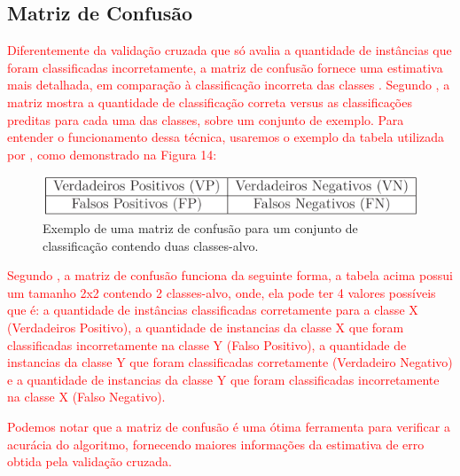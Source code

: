 \subsection{Matriz de Confusão}

\par
\textcolor{red}{Diferentemente da validação cruzada que só avalia a quantidade de instâncias que foram classificadas incorretamente, a matriz de confusão fornece uma estimativa mais detalhada, em comparação à classificação incorreta das classes \cite{Carvalho2014}. Segundo , a matriz mostra a quantidade de classificação correta versus as classificações preditas para cada uma das classes, sobre um conjunto de exemplo. Para entender o funcionamento dessa técnica, usaremos o exemplo da  tabela utilizada por , como demonstrado na Figura 14:}

\par
\begin{figure}[!htp]
	\begin{center}
    \caption{\label{fig:waveform_fig} Exemplo de uma matriz de confusão para um conjunto de classificação contendo duas classes-alvo.}
	\includegraphics[scale=0.80]{Figuras/Exemplo_matriz_de_confusao.png}
	\end{center}
\end{figure}

\par
\textcolor{red}{Segundo , a  matriz de confusão funciona da seguinte forma, a tabela acima possui um tamanho 2x2 contendo 2 classes-alvo, onde, ela pode ter 4 valores possíveis que é: a quantidade de instâncias classificadas corretamente para a classe X (Verdadeiros Positivo), a quantidade de instancias da classe X que foram classificadas incorretamente na classe Y (Falso Positivo), a quantidade de instancias da classe Y que foram classificadas corretamente (Verdadeiro Negativo) e a quantidade de instancias da classe Y que foram classificadas incorretamente na classe X (Falso Negativo).}

\par
\textcolor{red}{Podemos notar que a matriz de confusão é uma ótima ferramenta para verificar a acurácia do algoritmo, fornecendo maiores informações da estimativa de erro obtida pela validação cruzada.}

